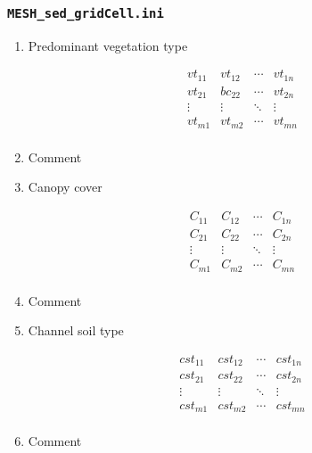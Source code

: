 \documentclass[12pt, letterpaper]{article}
\newcounter{ResumeEnumerate}
\begin{document}
\subsubsection{\texttt{MESH\_sed\_gridCell.ini}}
{\tiny
\begin{enumerate}[start=\numexpr\value{ResumeEnumerate}+1, label=Line \arabic*]\itemsep0em 
\item Predominant vegetation type\\[-2.7em]
\begin{minipage}[t]{0.1\linewidth}
\begin{flushright}
$$
\begin{matrix} 
vt_{11} & vt_{12} & \cdots & vt_{1n} \\
vt_{21} & bc_{22} & \cdots & vt_{2n} \\
\vdots & \vdots & \ddots & \vdots \\
vt_{m1} & vt_{m2} & \cdots & vt_{mn}\\
\end{matrix}
$$
\end{flushright}
\end{minipage}
\item Comment
\item Canopy cover\\[-2.7em]
\begin{minipage}[t]{0.1\linewidth}
\begin{flushright}
$$
\begin{matrix} 
C_{11} & C_{12} & \cdots & C_{1n} \\
C_{21} & C_{22} & \cdots & C_{2n} \\
\vdots & \vdots & \ddots & \vdots \\
C_{m1} & C_{m2} & \cdots & C_{mn}\\
\end{matrix}
$$
\end{flushright}
\end{minipage}
\item Comment
\item Channel soil type\\[-2.7em]
\begin{minipage}[t]{0.1\linewidth}
\begin{flushright}
$$
\begin{matrix} 
cst_{11} & cst_{12} & \cdots & cst_{1n} \\
cst_{21} & cst_{22} & \cdots & cst_{2n} \\
\vdots & \vdots & \ddots & \vdots \\
cst_{m1} & cst_{m2} & \cdots & cst_{mn}\\
\end{matrix}
$$
\end{flushright}
\end{minipage}
\item Comment
\end{enumerate}
}
\end{document}
